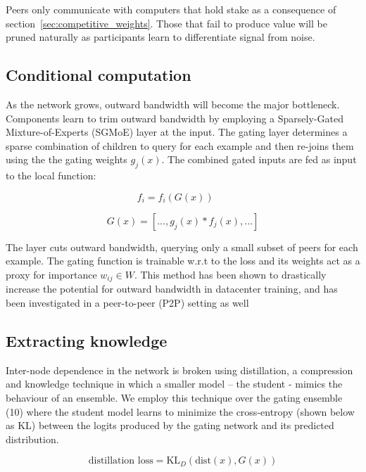 \documentclass{article}
\begin{document}
Peers only communicate with computers that hold stake as a consequence of section~\ref{sec:competitive_weights}. Those that fail to produce value will be pruned naturally as participants learn to differentiate signal from noise.

\subsection{Conditional computation}

As the network grows, outward bandwidth will become the major bottleneck. Components learn to trim outward bandwidth by employing a Sparsely-Gated Mixture-of-Experts (SGMoE) \cite{shazeer2017outrageously} layer at the input. The gating layer determines a sparse combination of children to query for each example and then re-joins them using the the gating weights $g_j(x)$. The combined gated inputs are fed as input to the local function: 

\begin{equation}
f_i = f_i(G(x)) \ \ \ \  \textrm{ }
\end{equation}

\begin{equation}
G(x) = [ ..., g_j(x) * f_j(x), ...]
\end{equation}


The layer cuts outward bandwidth, querying only a small subset of peers for each example. The gating function is trainable w.r.t to the loss and its weights act as a proxy for importance $w_{ij} \in W$. This method has been shown to drastically increase the potential for outward bandwidth in datacenter training,\cite{shazeer2017outrageously} and has been investigated in a peer-to-peer (P2P) setting as well \cite{Riabinin2020learningathome}


\subsection{Extracting knowledge}

Inter-node dependence in the network is broken using distillation\cite{hinton2015distilling}, a compression and knowledge technique in which a smaller model -- the student - mimics the behaviour of an ensemble. We employ this technique over the gating ensemble (10) where the student model learns to minimize the cross-entropy (shown below as KL) between the logits produced by the gating network and its predicted distribution. \cite{Sanh2019DistilBERT}
\smallskip

\begin{equation}
\textrm{distillation loss} = \text{KL}_D(\text{dist}(x), G(x)) 
\end{equation}
\end{document}
